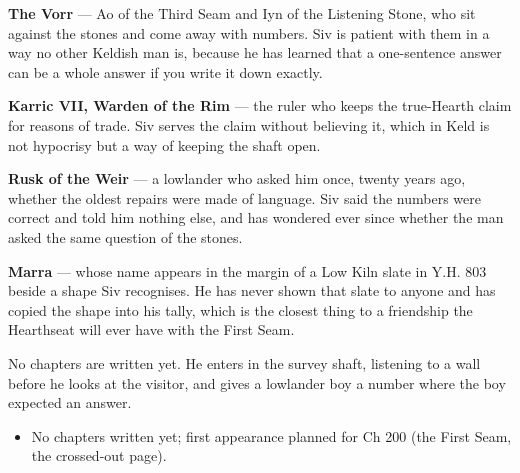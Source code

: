 \documentclass{design/chronicle}
\begin{document}
{\textbf{The Vorr} — Ao of the Third Seam and Iyn of the Listening Stone, who sit against the stones and come away with numbers. Siv is patient with them in a way no other Keldish man is, because he has learned that a one-sentence answer can be a whole answer if you write it down exactly.

\textbf{Karric VII, Warden of the Rim} — the ruler who keeps the true-Hearth claim for reasons of trade. Siv serves the claim without believing it, which in Keld is not hypocrisy but a way of keeping the shaft open.

\textbf{Rusk of the Weir} — a lowlander who asked him once, twenty years ago, whether the oldest repairs were made of language. Siv said the numbers were correct and told him nothing else, and has wondered ever since whether the man asked the same question of the stones.

\textbf{Marra} — whose name appears in the margin of a Low Kiln slate in Y.H. 803 beside a shape Siv recognises. He has never shown that slate to anyone and has copied the shape into his tally, which is the closest thing to a friendship the Hearthseat will ever have with the First Seam.

No chapters are written yet. He enters in the survey shaft, listening to a wall before he looks at the visitor, and gives a lowlander boy a number where the boy expected an answer.

\begin{itemize}[leftmargin=1.4em,itemsep=1pt,topsep=3pt,parsep=0pt]

\item No chapters written yet; first appearance planned for Ch 200 (the First Seam, the crossed-out page).

\end{itemize}
}
\end{document}

